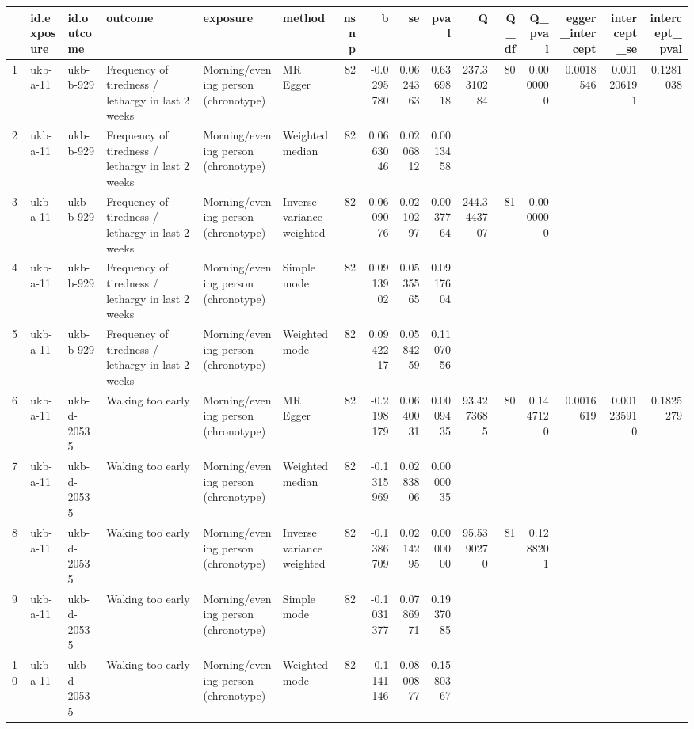 \begin{longtable}{llllllrrrrrrrrrr}
  \hline
 & id.exposure & id.outcome & outcome & exposure & method & nsnp & b & se & pval & Q & Q\_df & Q\_pval & egger\_intercept & intercept\_se & intercept\_pval \\ 
  \hline
1 & ukb-a-11 & ukb-b-929 & Frequency of tiredness / lethargy in last 2 weeks & Morning/evening person (chronotype) & MR Egger & 82 & -0.0295780 & 0.0624363 & 0.6369818 & 237.3310284 & 80 & 0.0000000 & 0.0018546 & 0.001206191 & 0.1281038 \\ 
  2 & ukb-a-11 & ukb-b-929 & Frequency of tiredness / lethargy in last 2 weeks & Morning/evening person (chronotype) & Weighted median & 82 & 0.0663046 & 0.0206812 & 0.0013458 &  &  &  &  &  &  \\ 
  3 & ukb-a-11 & ukb-b-929 & Frequency of tiredness / lethargy in last 2 weeks & Morning/evening person (chronotype) & Inverse variance weighted & 82 & 0.0609076 & 0.0210297 & 0.0037764 & 244.3443707 & 81 & 0.0000000 &  &  &  \\ 
  4 & ukb-a-11 & ukb-b-929 & Frequency of tiredness / lethargy in last 2 weeks & Morning/evening person (chronotype) & Simple mode & 82 & 0.0913902 & 0.0535565 & 0.0917604 &  &  &  &  &  &  \\ 
  5 & ukb-a-11 & ukb-b-929 & Frequency of tiredness / lethargy in last 2 weeks & Morning/evening person (chronotype) & Weighted mode & 82 & 0.0942217 & 0.0584259 & 0.1107056 &  &  &  &  &  &  \\ 
  6 & ukb-a-11 & ukb-d-20535 & Waking too early & Morning/evening person (chronotype) & MR Egger & 82 & -0.2198179 & 0.0640031 & 0.0009435 & 93.4273685 & 80 & 0.1447120 & 0.0016619 & 0.001235910 & 0.1825279 \\ 
  7 & ukb-a-11 & ukb-d-20535 & Waking too early & Morning/evening person (chronotype) & Weighted median & 82 & -0.1315969 & 0.0283806 & 0.0000035 &  &  &  &  &  &  \\ 
  8 & ukb-a-11 & ukb-d-20535 & Waking too early & Morning/evening person (chronotype) & Inverse variance weighted & 82 & -0.1386709 & 0.0214295 & 0.0000000 & 95.5390270 & 81 & 0.1288201 &  &  &  \\ 
  9 & ukb-a-11 & ukb-d-20535 & Waking too early & Morning/evening person (chronotype) & Simple mode & 82 & -0.1031377 & 0.0786971 & 0.1937085 &  &  &  &  &  &  \\ 
  10 & ukb-a-11 & ukb-d-20535 & Waking too early & Morning/evening person (chronotype) & Weighted mode & 82 & -0.1141146 & 0.0800877 & 0.1580367 &  &  &  &  &  &  \\ 

\end{longtable}
